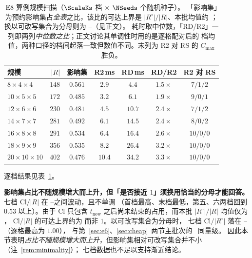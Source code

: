 \begin{table}[t]
\centering
\caption{E8 算例规模扫描（\(\ScaleKs\) 档 \(\times\) \(\NSeeds\) 个随机种子）。
「影响集」为预约影响集占\emph{全表}之比，该比的可达上界是 \(|R^{\circ}|/|R|\)、本批均值约
\ScaleAliveShare；换以可改写集合为分母则为 \ScaleCloAliveLo--\ScaleCloAliveHi（见正文）。
耗时取中位数，「RD/R2」一列即两列\emph{中位数之比}；正文讨论其单调性时用的是逐格配对后的
档均值，两种口径的档间起落一致但数值不同。末列为 R2 对 RS 的 \(C_{\max}\) 胜负。}
\label{tab:instscale}
\small
\begin{tabular}{@{}lrccccc@{}}
\toprule
规模 & \(|R|\) & 影响集 & R2\,ms & RD\,ms & RD/R2 & R2 对 RS \\
\midrule
\(8\times4\times4\)    & \(148\) & \(0.561\) & \(2.9\)  & \(4.4\)  & \(1.5\times\) & \(7/1/2\) \\
\(10\times5\times5\)   & \(172\) & \(0.485\) & \(3.2\)  & \(6.1\)  & \(1.9\times\) & \(9/0/1\) \\
\(12\times6\times6\)   & \(230\) & \(0.481\) & \(4.5\)  & \(10.7\) & \(2.4\times\) & \(7/1/2\) \\
\(14\times7\times7\)   & \(281\) & \(0.492\) & \(6.1\)  & \(14.5\) & \(2.4\times\) & \(8/0/2\) \\
\(16\times8\times8\)   & \(291\) & \(0.534\) & \(6.4\)  & \(16.4\) & \(2.6\times\) & \(10/0/0\) \\
\(18\times9\times9\)   & \(356\) & \(0.535\) & \(8.2\)  & \(26.4\) & \(3.2\times\) & \(10/0/0\) \\
\(20\times10\times10\) & \(402\) & \(0.476\) & \(10.4\) & \(34.2\) & \(3.3\times\) & \(10/0/0\) \\
\bottomrule
\end{tabular}
\end{table}

逐档结果见表~\ref{tab:instscale}。

\textbf{影响集占比不随规模增大而上升，但「是否接近 \(1\)」须换用恰当的分母才能回答。}
七档 \(\mathrm{Cl}/|R|\) 在 \ScaleCloLo--\ScaleCloHi 之间波动，且不单调
（首档最高、末档最低，第五、六两档回到 \(0.53\) 以上）。由于 \(\mathrm{Cl}\) 只包含
\(t_{\mathrm{now}}\) 之后尚未结束的占用，而本批 \(|R^{\circ}|/|R|\) 均值仅为 \ScaleAliveShare，
\(\mathrm{Cl}/|R|\) 的可达上界约为 \ScaleAliveShare 而非 \(1\)。以可改写集合为分母时，
七档 \(\mathrm{Cl}/|R^{\circ}|\) 落在 \ScaleCloAliveLo--\ScaleCloAliveHi（逐格最高为 \(1.00\)），
与第~\ref{sec:e6}、\ref{sec:cheap}~两节主批次的 \ClosureAliveFrac\ 同量级。
因此本节表明\emph{占比不随规模增大而上升}，但影响集相对可改写集合并不小（注~\ref{rem:minimality}）；
七档数据也不足以支持渐近结论。

